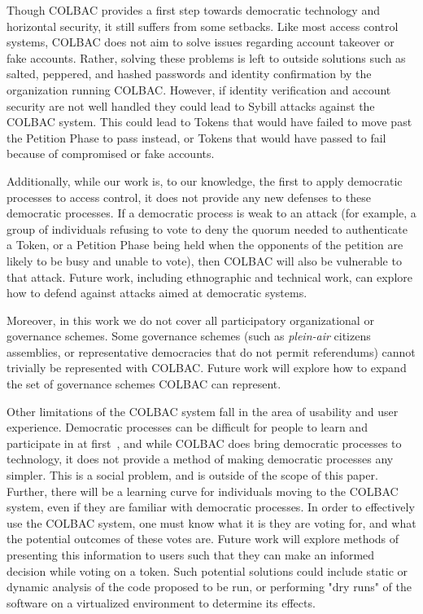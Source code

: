 Though COLBAC provides a first step towards democratic technology and horizontal
security, it still suffers from some setbacks. Like most access control
systems, COLBAC does not aim to solve issues regarding account takeover or fake
accounts. Rather, solving these problems is left to outside solutions such as
salted, peppered, and hashed passwords and identity confirmation by the
organization running COLBAC. However, if identity verification and account
security are not well handled they could lead to Sybill attacks against the
COLBAC system. This could lead to Tokens that would have failed to move past the
Petition Phase to pass instead, or Tokens that would have passed to fail because
of compromised or fake accounts. 

Additionally, while our work is, to our knowledge, the first to apply democratic
processes to access control, it does not provide any new defenses to these
democratic processes. If a democratic process is weak to an attack (for example,
a group of individuals refusing to vote to deny the quorum needed to
authenticate a Token, or a Petition Phase being held when the opponents of the
petition are likely to be busy and unable to vote), then COLBAC will also be
vulnerable to that attack. Future work, including ethnographic and technical
work, can explore how to defend against attacks aimed at democratic systems.

Moreover, in this work we do not cover all participatory organizational or
governance schemes. Some governance schemes (such as \textit{plein-air} citizens
assemblies, or representative democracies that do not permit referendums) cannot
trivially be represented with COLBAC. Future work will explore how to expand the
set of governance schemes COLBAC can represent.

Other limitations of the COLBAC system fall in the area of usability and user
experience. Democratic processes can be difficult for people to learn and
participate in at first~\cite{polletta2012freedom}, and while COLBAC does bring democratic processes
to technology, it does not provide a method of making democratic processes any
simpler. This is a social problem, and is outside of the scope of this paper. Further, there will be a learning curve for individuals moving to the
COLBAC system, even if they are familiar with democratic processes. In order to
effectively use the COLBAC system, one must know what it is they are voting for,
and what the potential outcomes of these votes are. Future work will explore
methods of presenting this information to users such that they can make an
informed decision while voting on a token. Such potential solutions could
include static or dynamic analysis of the code proposed to be run, or performing
"dry runs" of the software on a virtualized environment to determine its
effects.

